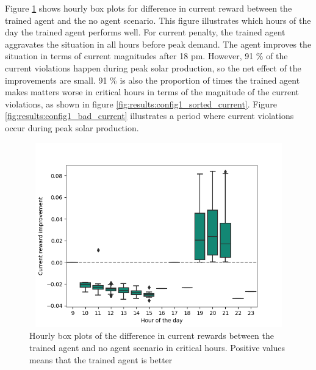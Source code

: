 \documentclass[class=book, crop=false, 11pt]{standalone}
\begin{document}
Figure \ref{fig:results:config1_improvement_current} shows hourly box plots for difference in current reward between the trained agent and the no agent scenario. This figure illustrates which hours of the day the trained agent performs well. For current penalty, the trained agent aggravates the situation in all hours before peak demand. The agent improves the situation in terms of current magnitudes after 18 pm. However, 91 \% of the current violations happen during peak solar production, so the net effect of the improvements are small. 91 \% is also the proportion of times the trained agent makes matters worse in critical hours in terms of the magnitude of the current violations, as shown in figure \ref{fig:results:config1_sorted_current}. Figure \ref{fig:results:config1_bad_current} illustrates a period where current violations occur during peak solar production.

\begin{figure}[h]
    \center
\includegraphics[height=8cm, width=12cm]{figures/config1_improvement_current.png}
    \caption[size = 9]{Hourly box plots of the difference in current rewards between the trained agent and no agent scenario in critical hours. Positive values means that the trained agent is better}
    \label{fig:results:config1_improvement_current}
\end{figure}
\end{document}
